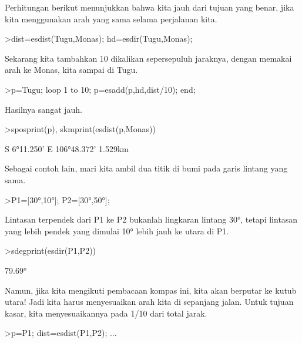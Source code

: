 \documentclass[a4paper,10pt]{article}
\begin{document}
\begin{eulernotebook}
\begin{eulercomment}
\begin{eulercomment}
\begin{eulercomment}
\begin{eulercomment}
\begin{eulercomment}
\begin{eulercomment}
\begin{eulercomment}
\begin{eulercomment}
\begin{eulercomment}
\begin{eulercomment}
\begin{eulercomment}
\begin{eulercomment}
\begin{eulercomment}
\begin{eulercomment}
\begin{eulercomment}
\begin{eulercomment}
\begin{eulercomment}
\begin{eulercomment}
\begin{eulercomment}
Perhitungan berikut menunjukkan bahwa kita jauh dari tujuan yang
benar, jika kita menggunakan arah yang sama selama perjalanan kita.
\end{eulercomment}
\begin{eulerprompt}
>dist=esdist(Tugu,Monas); hd=esdir(Tugu,Monas);
\end{eulerprompt}
\begin{eulercomment}
Sekarang kita tambahkan 10 dikalikan sepersepuluh jaraknya, dengan
memakai arah ke Monas, kita sampai di Tugu.
\end{eulercomment}
\begin{eulerprompt}
>p=Tugu; loop 1 to 10; p=esadd(p,hd,dist/10); end;
\end{eulerprompt}
\begin{eulercomment}
Hasilnya sangat jauh.
\end{eulercomment}
\begin{eulerprompt}
>sposprint(p), skmprint(esdist(p,Monas))
\end{eulerprompt}
\begin{euleroutput}
  S 6°11.250' E 106°48.372'
       1.529km
\end{euleroutput}
\begin{eulercomment}
Sebagai contoh lain, mari kita ambil dua titik di bumi pada garis
lintang yang sama.
\end{eulercomment}
\begin{eulerprompt}
>P1=[30°,10°]; P2=[30°,50°];
\end{eulerprompt}
\begin{eulercomment}
Lintasan terpendek dari P1 ke P2 bukanlah lingkaran lintang 30°,
tetapi lintasan yang lebih pendek yang dimulai 10° lebih jauh ke utara
di P1.
\end{eulercomment}
\begin{eulerprompt}
>sdegprint(esdir(P1,P2))
\end{eulerprompt}
\begin{euleroutput}
       79.69°
\end{euleroutput}
\begin{eulercomment}
Namun, jika kita mengikuti pembacaan kompas ini, kita akan berputar ke
kutub utara! Jadi kita harus menyesuaikan arah kita di sepanjang
jalan. Untuk tujuan kasar, kita menyesuaikannya pada 1/10 dari total
jarak.
\end{eulercomment}
\begin{eulerprompt}
>p=P1;  dist=esdist(P1,P2); ...

\end{eulerprompt}
\end{eulercomment}
\end{eulercomment}
\end{eulercomment}
\end{eulercomment}
\end{eulercomment}
\end{eulercomment}
\end{eulercomment}
\end{eulercomment}
\end{eulercomment}
\end{eulercomment}
\end{eulercomment}
\end{eulercomment}
\end{eulercomment}
\end{eulercomment}
\end{eulercomment}
\end{eulercomment}
\end{eulercomment}
\end{eulercomment}
\end{eulernotebook}
\end{document}
